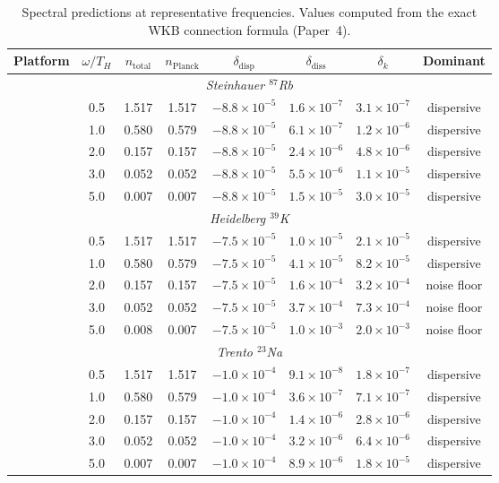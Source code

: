\documentclass[aps,prd,twocolumn,showpacs,superscriptaddress,nofootinbib]{revtex4-2}
\begin{document}
\begin{table}[t]
\caption{Spectral predictions at representative frequencies. Values computed
from the exact WKB connection formula (Paper~4).}
\label{tab:spectral}
\begin{ruledtabular}
\begin{tabular}{l c c c c c c c}
Platform & $\omega/T_H$ & $n_\text{total}$ & $n_\text{Planck}$ & $\delta_\text{disp}$ & $\delta_\text{diss}$ & $\delta_k$ & Dominant \\
\hline
\multicolumn{8}{c}{\textit{Steinhauer $^{87}$Rb}} \\
 & 0.5 & 1.517 & 1.517 & $-8.8\times10^{-5}$ & $1.6\times10^{-7}$ & $3.1\times10^{-7}$ & dispersive \\
 & 1.0 & 0.580 & 0.579 & $-8.8\times10^{-5}$ & $6.1\times10^{-7}$ & $1.2\times10^{-6}$ & dispersive \\
 & 2.0 & 0.157 & 0.157 & $-8.8\times10^{-5}$ & $2.4\times10^{-6}$ & $4.8\times10^{-6}$ & dispersive \\
 & 3.0 & 0.052 & 0.052 & $-8.8\times10^{-5}$ & $5.5\times10^{-6}$ & $1.1\times10^{-5}$ & dispersive \\
 & 5.0 & 0.007 & 0.007 & $-8.8\times10^{-5}$ & $1.5\times10^{-5}$ & $3.0\times10^{-5}$ & dispersive \\
\hline
\multicolumn{8}{c}{\textit{Heidelberg $^{39}$K}} \\
 & 0.5 & 1.517 & 1.517 & $-7.5\times10^{-5}$ & $1.0\times10^{-5}$ & $2.1\times10^{-5}$ & dispersive \\
 & 1.0 & 0.580 & 0.579 & $-7.5\times10^{-5}$ & $4.1\times10^{-5}$ & $8.2\times10^{-5}$ & dispersive \\
 & 2.0 & 0.157 & 0.157 & $-7.5\times10^{-5}$ & $1.6\times10^{-4}$ & $3.2\times10^{-4}$ & noise floor \\
 & 3.0 & 0.052 & 0.052 & $-7.5\times10^{-5}$ & $3.7\times10^{-4}$ & $7.3\times10^{-4}$ & noise floor \\
 & 5.0 & 0.008 & 0.007 & $-7.5\times10^{-5}$ & $1.0\times10^{-3}$ & $2.0\times10^{-3}$ & noise floor \\
\hline
\multicolumn{8}{c}{\textit{Trento $^{23}$Na}} \\
 & 0.5 & 1.517 & 1.517 & $-1.0\times10^{-4}$ & $9.1\times10^{-8}$ & $1.8\times10^{-7}$ & dispersive \\
 & 1.0 & 0.580 & 0.579 & $-1.0\times10^{-4}$ & $3.6\times10^{-7}$ & $7.1\times10^{-7}$ & dispersive \\
 & 2.0 & 0.157 & 0.157 & $-1.0\times10^{-4}$ & $1.4\times10^{-6}$ & $2.8\times10^{-6}$ & dispersive \\
 & 3.0 & 0.052 & 0.052 & $-1.0\times10^{-4}$ & $3.2\times10^{-6}$ & $6.4\times10^{-6}$ & dispersive \\
 & 5.0 & 0.007 & 0.007 & $-1.0\times10^{-4}$ & $8.9\times10^{-6}$ & $1.8\times10^{-5}$ & dispersive \\
\end{tabular}
\end{ruledtabular}
\end{table}
\end{document}
